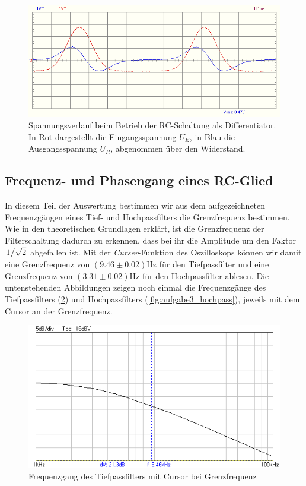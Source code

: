 \begin{figure}[H]
  \centering
  \includegraphics[width=.8\textwidth]{files/aufgabe2_differentiator_gauss.png}
  \caption{Spannungsverlauf beim Betrieb der RC-Schaltung als Differentiator. In Rot dargestellt die Eingangsspannung $U_E$, in Blau die Ausgangsspannung $U_R$, abgenommen über den Widerstand.}
  \label{fig:aufgabe2_differentiator_gauss}
\end{figure}


\subsection{Frequenz- und Phasengang eines RC-Glied}

In diesem Teil der Auswertung bestimmen wir aus dem aufgezeichneten Frequenzgängen eines Tief- und Hochpassfilters die Grenzfrequenz bestimmen. Wie in den theoretischen Grundlagen erklärt, ist die Grenzfrequenz der Filterschaltung dadurch zu erkennen, dass bei ihr die Amplitude um den Faktor $\flatfrac{1}{\sqrt{2}}$ abgefallen ist. Mit der \textit{Curser}-Funktion des Oszilloskops können wir damit eine Grenzfrequenz von $(9.46 \pm 0.02)\si{\hertz}$ für den Tiefpassfilter und eine Grenzfrequenz von $(3.31 \pm 0.02) \si{\hertz}$ für den Hochpassfilter ablesen. Die untenstehenden Abbildungen zeigen noch einmal die Frequenzgänge des Tiefpassfilters (\ref{fig:aufgabe3_tiefpass}) und Hochpassfilters (\ref{fig:aufgabe3_hochpass}), jeweils mit dem Cursor an der Grenzfrequenz.


\begin{figure}[H]
  \centering
  \includegraphics[width=.8\textwidth]{files/aufgabe3_tiefpass.png}
  \caption{Frequenzgang des Tiefpassfilters mit Cursor bei Grenzfrequenz}
  \label{fig:aufgabe3_tiefpass}
\end{figure}

